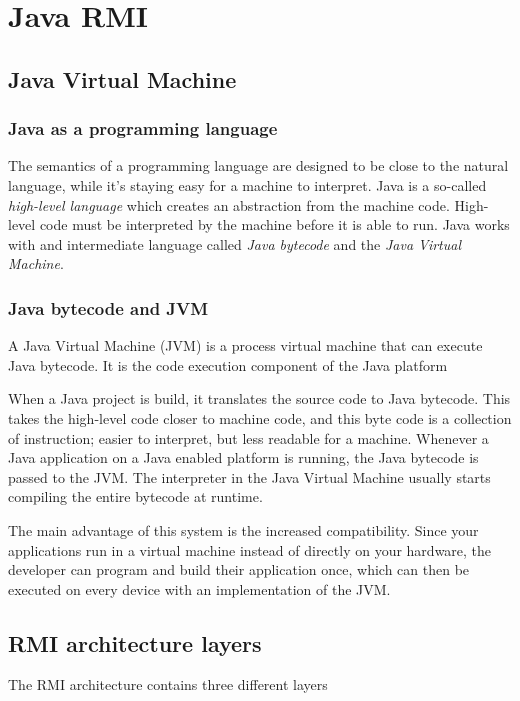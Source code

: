 \section{Java RMI}
\subsection{Java Virtual Machine}
\subsubsection{Java as a programming language}
The semantics of a programming language are designed to be close to the natural language, while it's staying easy for a machine to interpret. Java is a so-called \emph{high-level language} which creates an abstraction from the machine code. High-level code must be interpreted by the machine before it is able to run. Java works with and intermediate language called \emph{Java bytecode} and the \emph{Java Virtual Machine}.

\subsubsection{Java bytecode and JVM}
A Java Virtual Machine (JVM) is a process virtual machine that can execute Java bytecode. It is the code execution component of the Java platform

When a Java project is build, it translates the source code to Java bytecode. This takes the high-level code closer to machine code, and this byte code is a collection of instruction; easier to interpret, but less readable for a machine. Whenever a Java application on a Java enabled platform is running, the Java bytecode is passed to the JVM. The interpreter in the Java Virtual Machine usually starts compiling the entire bytecode at runtime.

The main advantage of this system is the increased compatibility. Since your applications run in a virtual machine instead of directly on your hardware, the developer can program and build their application once, which can then be executed on every device with an implementation of the JVM.

\subsection{RMI architecture layers}
The RMI architecture contains three different layers %

